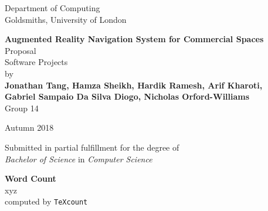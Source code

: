 \documentclass[12pt]{report}
\newcommand\blankpage{%
    \null
    \thispagestyle{empty}%
    \addtocounter{page}{-1}%
    \newpage}
\begin{document}
\begin{titlepage}
    \begin{center}
         \vspace*{1cm}
        Department of Computing\\
        Goldsmiths, University of London\\
        
        \vspace*{3.75cm}
        
        \textbf{\Large Augmented Reality Navigation System for Commercial Spaces}\\
        \vspace*{0.25cm}           
        Proposal\\
        Software Projects\\  
    
        \vspace*{2cm}
        by\\
        \vspace*{0.25cm}    
        \textbf{Jonathan Tang, Hamza Sheikh, Hardik Ramesh, Arif Kharoti,\\}
        \textbf{Gabriel Sampaio Da Silva Diogo, Nicholas Orford-Williams}\\
        \vspace*{0.1cm}    
        Group 14

        \vspace{2cm}
        
        Autumn 2018
        \vfill
        
        Submitted in partial fulfillment for the degree of\\
        \textit{Bachelor of Science} in \textit{Computer Science}
        
        \vspace{1.5cm}
        
    \end{center}
\end{titlepage}
\afterpage{\blankpage}
\thispagestyle{plain}

\begin{center}    
	\large
    \textbf{Word Count}\\
    xyz\\
    computed by \texttt{TeXcount}
\end{center}
\end{document}
